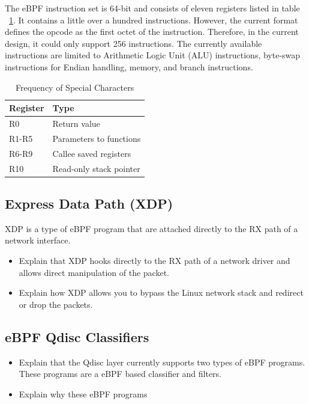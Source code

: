 \documentclass[sigconf, nonacm]{acmart}
\begin{document}
The eBPF instruction set is 64-bit and consists of eleven registers listed in
table ~\ref{table:eBPF_registers}. It contains a little over a hundred
instructions. However, the current format defines the opcode as the first octet
of the instruction. Therefore, in the current design, it could only support 256
instructions. The currently available instructions are limited to Arithmetic
Logic Unit (ALU) instructions, byte-swap instructions for Endian handling,
memory, and branch instructions.

\begin{table}
  \caption{Frequency of Special Characters}
  \label{tab:freq}
  \begin{tabular}{ll}
    \toprule
    Register & Type                    \\
    \midrule
    R0       & Return value            \\
    R1-R5    & Parameters to functions \\
    R6-R9    & Callee saved registers  \\
    R10      & Read-only stack pointer \\
    \bottomrule
\end{tabular}
\label{table:eBPF_registers}
\end{table}


\subsection{Express Data Path (XDP)}

XDP is a type of eBPF program that are attached directly to the RX path of a
network interface.

\begin{itemize}
  \item Explain that XDP hooks directly to the RX path of a network driver and allows direct manipulation of the packet.
  \item Explain how XDP allows you to bypass the Linux network stack and redirect or drop the packets.
\end{itemize}


\subsection{eBPF Qdisc Classifiers}

\begin{itemize}
  \item Explain that the Qdisc layer currently supports two types of eBPF programs. These programs are a eBPF based classifier and filters.
  \item Explain why these eBPF programs
\end{itemize}
\end{document}

